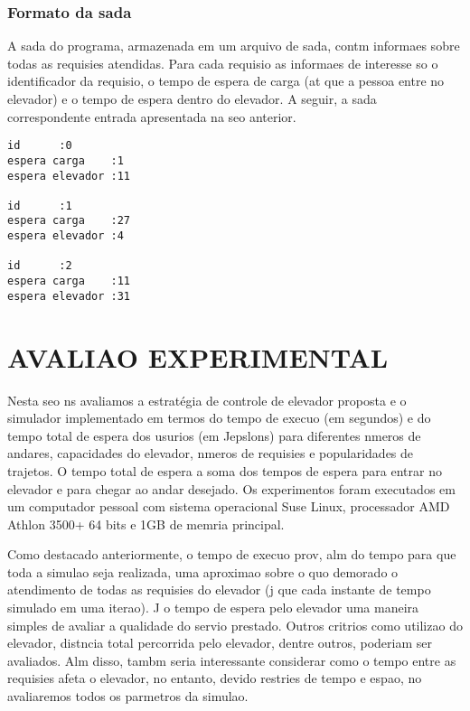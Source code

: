 \documentclass[12pt]{article}
\begin{document}
\subsubsection{Formato da sada}

A sada do programa, armazenada em um arquivo de sada, contm informaes sobre todas as requisies atendidas.  Para cada requisio as informaes de interesse so o identificador da requisio, o tempo de espera de carga (at que a pessoa entre no elevador) e o tempo de espera dentro do elevador. A seguir, a sada correspondente  entrada apresentada na seo anterior.

\begin{footnotesize}
\begin{verbatim}
id		:0
espera carga	:1
espera elevador	:11

id		:1
espera carga	:27
espera elevador	:4

id		:2
espera carga	:11
espera elevador	:31
\end{verbatim}
\end{footnotesize}


\section{AVALIAO EXPERIMENTAL}
\label{avaliacao_experimental}

Nesta seo ns avaliamos a estratégia de controle de elevador proposta e o simulador implementado em termos do tempo de execuo (em segundos) e do tempo total de espera dos usurios (em Jepslons) para diferentes nmeros de andares, capacidades do elevador, nmeros de requisies e popularidades de trajetos. O tempo total de espera  a soma dos tempos de espera para entrar no elevador e para chegar ao andar desejado. Os experimentos foram executados em um computador pessoal com sistema operacional Suse Linux, processador AMD Athlon 3500+ 64 bits e 1GB de memria principal.

Como destacado anteriormente, o tempo de execuo prov, alm do tempo para que toda a simulao seja realizada, uma aproximao sobre o quo demorado  o atendimento de todas as requisies do elevador (j que cada instante de tempo  simulado em uma iterao). J o tempo de espera pelo elevador  uma maneira simples de avaliar a qualidade do servio prestado. Outros critrios como utilizao do elevador, distncia total percorrida pelo elevador, dentre outros, poderiam ser avaliados. Alm disso, tambm seria interessante considerar como o tempo entre as requisies afeta o elevador, no entanto, devido  restries de tempo e espao, no avaliaremos todos os parmetros da simulao.
\end{document}
